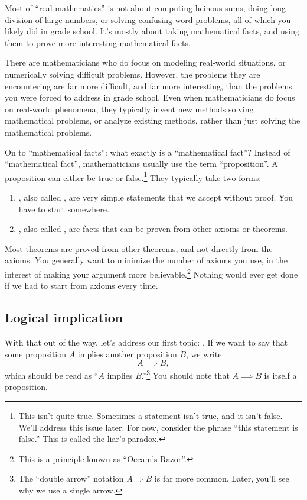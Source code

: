 Most of ``real mathematics'' is not about computing heinous sums,
doing long division of large numbers, or solving confusing word
problems, all of which you likely did in grade school. It's mostly
about taking mathematical facts, and using them to prove more
interesting mathematical facts.

There are mathematicians who do focus on modeling real-world
situations, or numerically solving difficult problems. However, the
problems they are encountering are far more difficult, and far more
interesting, than the problems you were forced to address in grade
school. Even when mathematicians do focus on real-world phenomena,
they typically invent new methods solving mathematical problems, or
analyze existing methods, rather than just solving the mathematical
problems.

On to ``mathematical facts'': what exactly is a ``mathematical fact''?
Instead of ``mathematical fact'', mathematicians usually use the term
``proposition''. A proposition can either be true or
false.\footnote{This isn't quite true. Sometimes a statement isn't
  true, and it isn't false. We'll address this issue later. For now,
  consider the phrase ``this statement is false.'' This is called the
  liar's paradox.}  They typically take two forms:

\begin{enumerate}
\item {}, also called , are very simple
  statements that we accept without proof. You have to start
  somewhere.
\item {}, also called , are facts that can
  be proven from other axioms or theorems.
\end{enumerate}

Most theorems are proved from other theorems, and not directly from
the axioms. You generally want to minimize the number of axioms you
use, in the interest of making your argument more
believable.\footnote{This is a principle known as ``Occam's Razor''.}
Nothing would ever get done if we had to start from axioms every time.

\subsection{Logical implication}

With that out of the way, let's address our first topic:
. If we want to say that some proposition $A$
implies another proposition $B$, we write $$A \implies B,$$ which
should be read as ``$A$ implies $B$.''\footnote{The ``double arrow''
  notation $A \Rightarrow B$ is far more common. Later, you'll see why
  we use a single arrow.}  You should note that $A \implies B$ is
itself a proposition.

